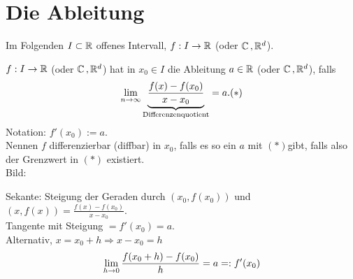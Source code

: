 \documentclass[../ana1.tex]{subfiles}
\begin{document}
\setcounter{section}{17}
\section{Die Ableitung}

Im Folgenden \( I \subset \mathbb{R} \) offenes Intervall, 
\( f: I \rightarrow \mathbb{R} \) (oder \( \mathbb{C} \operatorname{,} \mathbb{R}^d \)).

\begin{defi}[Ableitung]
    \( f : I \rightarrow \mathbb{R} \) (oder \( \mathbb{C} \operatorname{,} \mathbb{R}^d \)) 
    hat in \( x_0 \in I \) die Ableitung \( a\in \mathbb{R} \) 
    (oder \( \mathbb{C} \operatorname{,} \mathbb{R}^d \)), falls 
    \[ \lim\limits_{n\rightarrow\infty} \underbrace{\frac{f(x) - f(x_0)}{x - x_0}}_{
        \text{Differenzenquotient}
    } = a. (*) \]
    Notation: \( f'(x_0) := a \).\\
    Nennen \(f\) differenzierbar (diffbar) in \(x_0\), falls 
    es so ein \(a\) mit \((*)\)gibt, falls also der Grenzwert 
    in \((*)\) existiert.\\
    Bild:
    \begin{center}
    \end{center}
    Sekante: Steigung der Geraden durch \( (x_0, f(x_0)) \) und 
    \((x, f(x)) = \frac{f(x) - f(x_0)}{x - x_0}\).\\
    Tangente mit Steigung \( = f'(x_0) = a \).\\
    Alternativ, \( x = x_0 + h \Rightarrow x - x_0 = h \)
    \[ \lim\limits_{h\rightarrow 0} \frac{f(x_0 + h) - f(x_0)}{h} = a =: f'(x_0) \]
\end{defi}
\end{document}
